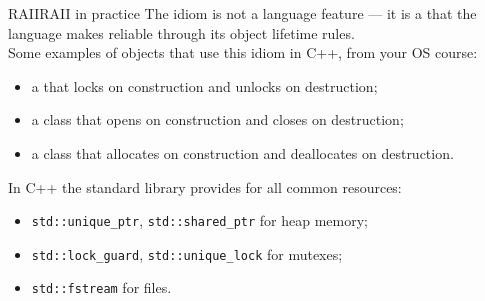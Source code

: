 \begin{frame}{RAII}{RAII in practice}
	\justifying
	The idiom is not a language feature — it is a  that the language makes reliable through its object lifetime rules.\\
	\smallskip
	Some examples of objects that use this idiom in C++, from your OS course:
	\begin{itemize}
		\item a  that locks on construction and unlocks on destruction;
		\item a  class that opens on construction and closes on destruction;
		\item a  class that allocates on construction and deallocates on destruction.
	\end{itemize}
	\smallskip
	In C++ the standard library provides  for all common resources:
	\begin{itemize}
		\item \texttt{std::unique\_ptr}, \texttt{std::shared\_ptr} for heap memory;
		\item \texttt{std::lock\_guard}, \texttt{std::unique\_lock} for mutexes;
		\item \texttt{std::fstream} for files.
	\end{itemize}
\end{frame}
